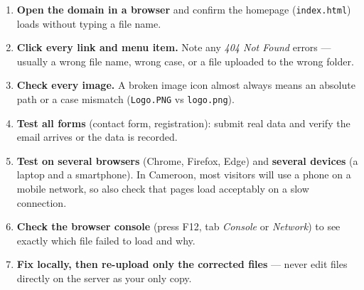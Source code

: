 \documentclass[11pt]{article}
\begin{document}
\begin{methode}
\begin{enumerate}
\item \textbf{Open the domain in a browser} and confirm the homepage (\texttt{index.html}) loads without typing a file name.
\item \textbf{Click every link and menu item.} Note any \emph{404 Not Found} errors — usually a wrong file name, wrong case, or a file uploaded to the wrong folder.
\item \textbf{Check every image.} A broken image icon almost always means an absolute path or a case mismatch (\texttt{Logo.PNG} vs \texttt{logo.png}).
\item \textbf{Test all forms} (contact form, registration): submit real data and verify the email arrives or the data is recorded.
\item \textbf{Test on several browsers} (Chrome, Firefox, Edge) and \textbf{several devices} (a laptop and a smartphone). In Cameroon, most visitors will use a phone on a mobile network, so also check that pages load acceptably on a slow connection.
\item \textbf{Check the browser console} (press F12, tab \emph{Console} or \emph{Network}) to see exactly which file failed to load and why.
\item \textbf{Fix locally, then re-upload only the corrected files} — never edit files directly on the server as your only copy.
\end{enumerate}
\end{methode}
\end{document}
